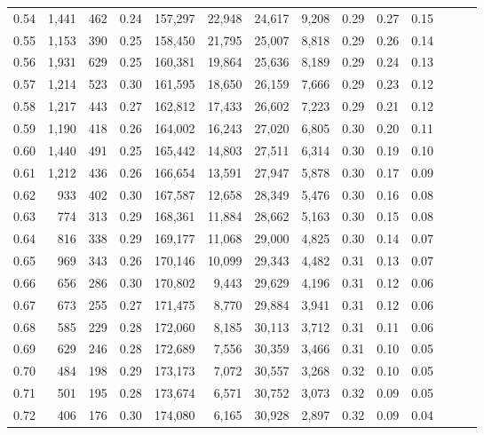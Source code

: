\begin{tabular}{rrrrrrrrrrrrrr}
0.54 &  1,441 &  462 &  0.24 &  157,297 &   22,948 &  24,617 &   9,208 &  0.29 &  0.27 &      0.15 \\
0.55 &  1,153 &  390 &  0.25 &  158,450 &   21,795 &  25,007 &   8,818 &  0.29 &  0.26 &      0.14 \\
0.56 &  1,931 &  629 &  0.25 &  160,381 &   19,864 &  25,636 &   8,189 &  0.29 &  0.24 &      0.13 \\
0.57 &  1,214 &  523 &  0.30 &  161,595 &   18,650 &  26,159 &   7,666 &  0.29 &  0.23 &      0.12 \\
0.58 &  1,217 &  443 &  0.27 &  162,812 &   17,433 &  26,602 &   7,223 &  0.29 &  0.21 &      0.12 \\
0.59 &  1,190 &  418 &  0.26 &  164,002 &   16,243 &  27,020 &   6,805 &  0.30 &  0.20 &      0.11 \\
0.60 &  1,440 &  491 &  0.25 &  165,442 &   14,803 &  27,511 &   6,314 &  0.30 &  0.19 &      0.10 \\
0.61 &  1,212 &  436 &  0.26 &  166,654 &   13,591 &  27,947 &   5,878 &  0.30 &  0.17 &      0.09 \\
0.62 &    933 &  402 &  0.30 &  167,587 &   12,658 &  28,349 &   5,476 &  0.30 &  0.16 &      0.08 \\
0.63 &    774 &  313 &  0.29 &  168,361 &   11,884 &  28,662 &   5,163 &  0.30 &  0.15 &      0.08 \\
0.64 &    816 &  338 &  0.29 &  169,177 &   11,068 &  29,000 &   4,825 &  0.30 &  0.14 &      0.07 \\
0.65 &    969 &  343 &  0.26 &  170,146 &   10,099 &  29,343 &   4,482 &  0.31 &  0.13 &      0.07 \\
0.66 &    656 &  286 &  0.30 &  170,802 &    9,443 &  29,629 &   4,196 &  0.31 &  0.12 &      0.06 \\
0.67 &    673 &  255 &  0.27 &  171,475 &    8,770 &  29,884 &   3,941 &  0.31 &  0.12 &      0.06 \\
0.68 &    585 &  229 &  0.28 &  172,060 &    8,185 &  30,113 &   3,712 &  0.31 &  0.11 &      0.06 \\
0.69 &    629 &  246 &  0.28 &  172,689 &    7,556 &  30,359 &   3,466 &  0.31 &  0.10 &      0.05 \\
0.70 &    484 &  198 &  0.29 &  173,173 &    7,072 &  30,557 &   3,268 &  0.32 &  0.10 &      0.05 \\
0.71 &    501 &  195 &  0.28 &  173,674 &    6,571 &  30,752 &   3,073 &  0.32 &  0.09 &      0.05 \\
0.72 &    406 &  176 &  0.30 &  174,080 &    6,165 &  30,928 &   2,897 &  0.32 &  0.09 &      0.04 \\

\end{tabular}
